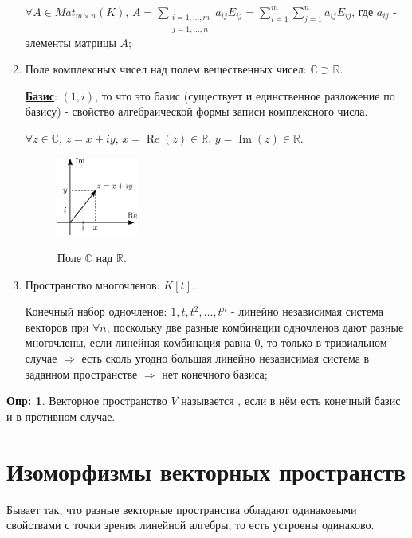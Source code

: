 \documentclass[12pt]{article}
\newcommand{\MR}{\mathbb{R}}
\newcommand{\MC}{\mathbb{C}}
\theoremstyle{definition}
\newtheorem{defn}{Опр:}
\newcommand{\ddsum}[2]{\displaystyle\sum\limits_{#1}^{#2}}
\newcommand{\mat}[2]{Mat_{#1\times #2}}
\begin{document}
\begin{enumerate}[label=(\arabic*)]
	$\forall A \in \mat{m}{n}(K), \, A = \ddsum{\substack{i = 1,\dotsc,m\\j = 1,\dotsc, n}}{} a_{ij}E_{ij} = \ddsum{i = 1}{m}\ddsum{j = 1}{n}a_{ij}E_{ij}$, где $a_{ij}$ - элементы матрицы $A$;
	
	\item Поле комплексных чисел над полем вещественных чисел: $\MC \supset \MR$.
	
	\textbf{\uline{Базис}}: $(1,i)$, то что это базис (существует и единственное разложение по базису) - свойство алгебраической формы записи комплексного числа.
	
	$\forall z \in \MC, \, z = x + iy, \, x = \operatorname{Re}(z) \in \MR, \, y = \operatorname{Im}(z) \in \MR$.
	\begin{figure}[H]
		\centering
		\includegraphics[width=0.25\textwidth]{LAL1_2.eps}
		\label{LAL1_2}
		\caption{Поле $\MC$ над  $\MR$.}
		\label{fig: поле компл над веществ}
	\end{figure}

	\item Пространство многочленов: $K[t]$.
	
	Конечный набор одночленов: $1,t,t^2, \dotsc, t^n$ - линейно независимая система векторов при $\forall n$, поскольку две разные комбинации одночленов дают разные многочлены, если линейная комбинация равна $0$, то только в тривиальном случае $\Rightarrow$ есть сколь угодно большая линейно независимая система в заданном пространстве $\Rightarrow$ нет конечного базиса;
\end{enumerate}

\begin{defn}
	Векторное пространство $V$ называется , если в нём есть конечный базис и  в противном случае.
\end{defn}
\newpage
\section*{Изоморфизмы векторных пространств}
Бывает так, что разные векторные пространства обладают одинаковыми свойствами с точки зрения линейной алгебры, то есть устроены одинаково.
\end{document}
